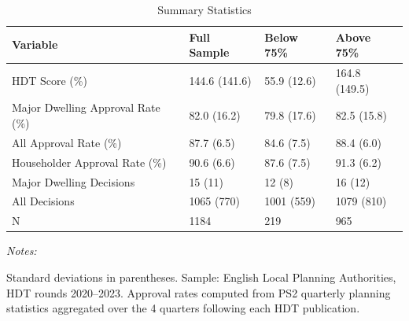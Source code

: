\begin{table}[!h]
\centering
\caption{\label{tab:tab:summary}Summary Statistics}
\centering
\begin{threeparttable}
\begin{tabular}[t]{llll}
\toprule
Variable & Full Sample & Below 75\% & Above 75\%\\
\midrule
HDT Score (\%) & 144.6 (141.6) & 55.9 (12.6) & 164.8 (149.5)\\
Major Dwelling Approval Rate (\%) & 82.0 (16.2) & 79.8 (17.6) & 82.5 (15.8)\\
All Approval Rate (\%) & 87.7 (6.5) & 84.6 (7.5) & 88.4 (6.0)\\
Householder Approval Rate (\%) & 90.6 (6.6) & 87.6 (7.5) & 91.3 (6.2)\\
Major Dwelling Decisions & 15 (11) & 12 (8) & 16 (12)\\
\addlinespace
All Decisions & 1065 (770) & 1001 (559) & 1079 (810)\\
N & 1184 & 219 & 965\\
\bottomrule
\end{tabular}
\begin{tablenotes}
\item \textit{Notes:} 
\item Standard deviations in parentheses. Sample: English Local Planning Authorities, HDT rounds 2020--2023. Approval rates computed from PS2 quarterly planning statistics aggregated over the 4 quarters following each HDT publication.
\end{tablenotes}
\end{threeparttable}
\end{table}
